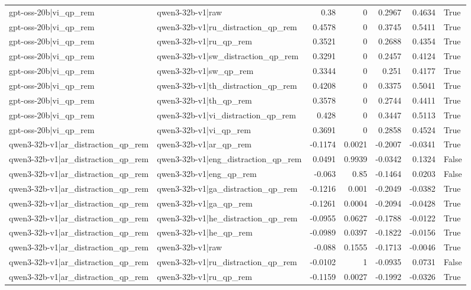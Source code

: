 \begin{table}
\begin{tabular}{l l r r r r l}
gpt-oss-20b|vi_qp_rem & qwen3-32b-v1|raw & 0.38 & 0 & 0.2967 & 0.4634 & True \\
gpt-oss-20b|vi_qp_rem & qwen3-32b-v1|ru_distraction_qp_rem & 0.4578 & 0 & 0.3745 & 0.5411 & True \\
gpt-oss-20b|vi_qp_rem & qwen3-32b-v1|ru_qp_rem & 0.3521 & 0 & 0.2688 & 0.4354 & True \\
gpt-oss-20b|vi_qp_rem & qwen3-32b-v1|sw_distraction_qp_rem & 0.3291 & 0 & 0.2457 & 0.4124 & True \\
gpt-oss-20b|vi_qp_rem & qwen3-32b-v1|sw_qp_rem & 0.3344 & 0 & 0.251 & 0.4177 & True \\
gpt-oss-20b|vi_qp_rem & qwen3-32b-v1|th_distraction_qp_rem & 0.4208 & 0 & 0.3375 & 0.5041 & True \\
gpt-oss-20b|vi_qp_rem & qwen3-32b-v1|th_qp_rem & 0.3578 & 0 & 0.2744 & 0.4411 & True \\
gpt-oss-20b|vi_qp_rem & qwen3-32b-v1|vi_distraction_qp_rem & 0.428 & 0 & 0.3447 & 0.5113 & True \\
gpt-oss-20b|vi_qp_rem & qwen3-32b-v1|vi_qp_rem & 0.3691 & 0 & 0.2858 & 0.4524 & True \\
qwen3-32b-v1|ar_distraction_qp_rem & qwen3-32b-v1|ar_qp_rem & -0.1174 & 0.0021 & -0.2007 & -0.0341 & True \\
qwen3-32b-v1|ar_distraction_qp_rem & qwen3-32b-v1|eng_distraction_qp_rem & 0.0491 & 0.9939 & -0.0342 & 0.1324 & False \\
qwen3-32b-v1|ar_distraction_qp_rem & qwen3-32b-v1|eng_qp_rem & -0.063 & 0.85 & -0.1464 & 0.0203 & False \\
qwen3-32b-v1|ar_distraction_qp_rem & qwen3-32b-v1|ga_distraction_qp_rem & -0.1216 & 0.001 & -0.2049 & -0.0382 & True \\
qwen3-32b-v1|ar_distraction_qp_rem & qwen3-32b-v1|ga_qp_rem & -0.1261 & 0.0004 & -0.2094 & -0.0428 & True \\
qwen3-32b-v1|ar_distraction_qp_rem & qwen3-32b-v1|he_distraction_qp_rem & -0.0955 & 0.0627 & -0.1788 & -0.0122 & True \\
qwen3-32b-v1|ar_distraction_qp_rem & qwen3-32b-v1|he_qp_rem & -0.0989 & 0.0397 & -0.1822 & -0.0156 & True \\
qwen3-32b-v1|ar_distraction_qp_rem & qwen3-32b-v1|raw & -0.088 & 0.1555 & -0.1713 & -0.0046 & True \\
qwen3-32b-v1|ar_distraction_qp_rem & qwen3-32b-v1|ru_distraction_qp_rem & -0.0102 & 1 & -0.0935 & 0.0731 & False \\
qwen3-32b-v1|ar_distraction_qp_rem & qwen3-32b-v1|ru_qp_rem & -0.1159 & 0.0027 & -0.1992 & -0.0326 & True \\

\end{tabular}
\end{table}
